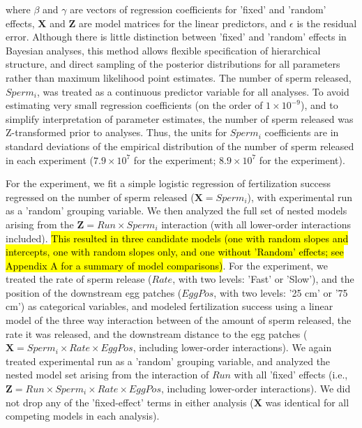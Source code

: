 \documentclass{article}
\begin{document}
	\noindent where $\beta$ and $\gamma$ are vectors of regression coefficients for 'fixed' and 'random' effects, $\mathbf{X}$ and $\mathbf{Z}$ are model matrices for the linear predictors, and $\epsilon$ is the residual error. Although there is little distinction between 'fixed' and 'random' effects in Bayesian analyses, this method allows flexible specification of hierarchical structure, and direct sampling of the posterior distributions for all parameters rather than maximum likelihood point estimates. The number of sperm released, $Sperm_i$, was treated as a continuous predictor variable for all analyses. To avoid estimating very small regression coefficients (on the order of $1 \times 10^{-9}$), and to simplify interpretation of parameter estimates, the number of sperm released was Z-transformed prior to analyses. Thus, the units for $Sperm_i$ coefficients are in standard deviations of the empirical distribution of the number of sperm released in each experiment ($7.9 \times 10^{7}$ for the  experiment; $8.9 \times 10^{7}$ for the  experiment). 

	For the  experiment, we fit a simple logistic regression of fertilization success regressed on the number of sperm released ($\mathbf{X} = Sperm_i$), with experimental run as a 'random' grouping variable. We then analyzed the full set of nested models arising from the $\mathbf{Z} = Run \times Sperm_i$ interaction (with all lower-order interactions included). \hl{This resulted in three candidate models (one with random slopes and intercepts, one with random slopes only, and one without 'Random' effects; see Appendix A for a summary of model comparisons)}. For the  experiment, we treated the rate of sperm release ($Rate$, with two levels: 'Fast' or 'Slow'), and the position of the downstream egg patches ($EggPos$, with two levels: '25 cm' or '75 cm') as categorical variables, and modeled fertilization success using a linear model of the three way interaction between of the amount of sperm released, the rate it was released, and the downstream distance to the egg patches ($ \mathbf{X} = Sperm_i \times Rate \times EggPos$, including lower-order interactions). We again treated experimental run as a 'random' grouping variable, and analyzed the nested model set arising from the interaction of $Run$ with all 'fixed' effects (i.e., $\mathbf{Z} = Run \times Sperm_i \times Rate \times EggPos$, including lower-order interactions). We did not drop any of the 'fixed-effect' terms in either analysis ($\mathbf{X}$ was identical for all competing models in each analysis).
\end{document}
